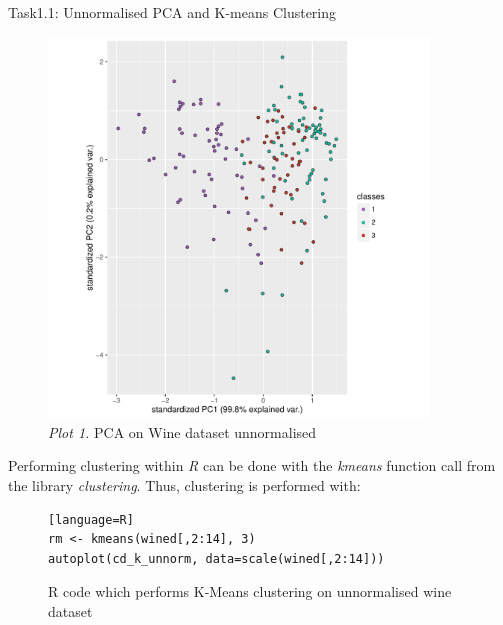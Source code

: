 \documentclass[11pt]{article}
\begin{document}
\begin{subsection}{Task1.1: Unnormalised PCA and K-means Clustering}
\begin{figure}[H]
    \centering
    \includegraphics[width=0.9\textwidth]{p1_un}
    \caption{\textit{Plot 1.} PCA on Wine dataset unnormalised}
    \label{fig:pca_un}
\end{figure}

Performing clustering within \textit{R} can be done with the \textit{kmeans} function call from the library \textit{clustering}. Thus, clustering is performed with:

\begin{figure}[H]
\centering
\begin{lstlisting}[basicstyle=\ttfamily][language=R]
rm <- kmeans(wined[,2:14], 3)
autoplot(cd_k_unnorm, data=scale(wined[,2:14]))
\end{lstlisting}
\caption{R code which performs K-Means clustering on unnormalised wine dataset}
\label{fig:kmeans_r_code}
\end{figure}


\end{subsection}
\end{document}
